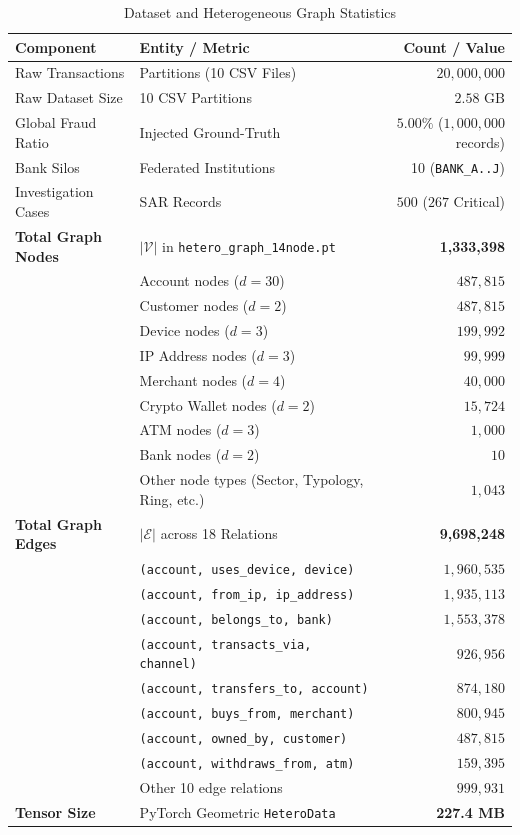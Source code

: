 \documentclass[conference]{IEEEtran}
\begin{document}
\begin{table}[htbp]
\caption{Dataset and Heterogeneous Graph Statistics}
\label{tab:dataset_stats}
\centering
\begin{tabular}{@{}llr@{}}
\toprule
\textbf{Component} & \textbf{Entity / Metric} & \textbf{Count / Value} \\
\midrule
Raw Transactions & Partitions (10 CSV Files) & $20,000,000$ \\
Raw Dataset Size & 10 CSV Partitions & $2.58\text{ GB}$ \\
Global Fraud Ratio & Injected Ground-Truth & $5.00\%$ ($1,000,000$ records) \\
Bank Silos & Federated Institutions & 10 (\texttt{BANK\_A..J}) \\
Investigation Cases & SAR Records & $500$ ($267$ Critical) \\
\midrule
\textbf{Total Graph Nodes} & $|\mathcal{V}|$ in \texttt{hetero\_graph\_14node.pt} & \textbf{1,333,398} \\
& Account nodes ($d=30$) & $487,815$ \\
& Customer nodes ($d=2$) & $487,815$ \\
& Device nodes ($d=3$) & $199,992$ \\
& IP Address nodes ($d=3$) & $99,999$ \\
& Merchant nodes ($d=4$) & $40,000$ \\
& Crypto Wallet nodes ($d=2$) & $15,724$ \\
& ATM nodes ($d=3$) & $1,000$ \\
& Bank nodes ($d=2$) & $10$ \\
& Other node types (Sector, Typology, Ring, etc.) & $1,043$ \\
\midrule
\textbf{Total Graph Edges} & $|\mathcal{E}|$ across 18 Relations & \textbf{9,698,248} \\
& \texttt{(account, uses\_device, device)} & $1,960,535$ \\
& \texttt{(account, from\_ip, ip\_address)} & $1,935,113$ \\
& \texttt{(account, belongs\_to, bank)} & $1,553,378$ \\
& \texttt{(account, transacts\_via, channel)} & $926,956$ \\
& \texttt{(account, transfers\_to, account)} & $874,180$ \\
& \texttt{(account, buys\_from, merchant)} & $800,945$ \\
& \texttt{(account, owned\_by, customer)} & $487,815$ \\
& \texttt{(account, withdraws\_from, atm)} & $159,395$ \\
& Other 10 edge relations & $999,931$ \\
\midrule
\textbf{Tensor Size} & PyTorch Geometric \texttt{HeteroData} & \textbf{227.4 MB} \\
\bottomrule
\end{tabular}
\end{table}
\end{document}
